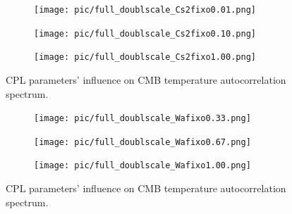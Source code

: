 \documentclass[serif, aspectratio=169]{beamer}
\begin{document}
\begin{frame}
	\begin{figure}
	\centering
	\begin{subfigure}[t]{.32\linewidth}
		\centering
		\texttt{[image: pic/full\_doublscale\_Cs2fixo0.01.png]}
	\end{subfigure}
	\hfill
	\begin{subfigure}[t]{.32\linewidth}
		\centering
		\texttt{[image: pic/full\_doublscale\_Cs2fixo0.10.png]}
	\end{subfigure}
	\hfill
	\begin{subfigure}[t]{.32\linewidth}
		\centering
		\texttt{[image: pic/full\_doublscale\_Cs2fixo1.00.png]}
	\end{subfigure}
	\caption{CPL parameters' influence on CMB temperature autocorrelation spectrum.}
	\end{figure}
\end{frame}

\begin{frame}
	\begin{figure}
	\centering
	\begin{subfigure}[t]{.32\linewidth}
		\centering
		\texttt{[image: pic/full\_doublscale\_Wafixo0.33.png]}
	\end{subfigure}
	\hfill
	\begin{subfigure}[t]{.32\linewidth}
		\centering
		\texttt{[image: pic/full\_doublscale\_Wafixo0.67.png]}
	\end{subfigure}
	\hfill
	\begin{subfigure}[t]{.32\linewidth}
		\centering
		\texttt{[image: pic/full\_doublscale\_Wafixo1.00.png]}
	\end{subfigure}
	\caption{CPL parameters' influence on CMB temperature autocorrelation spectrum.}
	\end{figure}
\end{frame}

\end{document}
